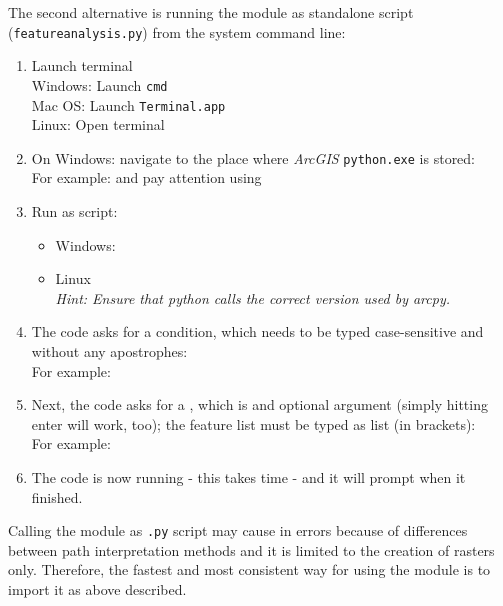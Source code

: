 The second alternative is running the module as standalone script (\texttt{feature{\myUnderscore}analysis.py}) from the system command line:
\begin{enumerate}
\item Launch terminal\\
	Windows: Launch \texttt{cmd}\\
	Mac OS: Launch \texttt{Terminal.app}\\
	Linux: Open terminal 
	\item On Windows: navigate to the place where \textit{ArcGIS} \texttt{python.exe} is stored:\\
	For example:  and pay attention using \\
	\item Run  as script:
	\begin{itemize}
		\item Windows: \pythoninline{python.exe DriveLetter:\\...\\LifespanDesign\\feature_analysis "condition" ["Feature"}\\\pythoninline{"name"]}
		\item Linux \\
		\textit{Hint: Ensure that python calls the correct version used by arcpy.}
	\end{itemize}
	\item The code asks for a condition, which needs to be typed case-sensitive and without any apostrophes:\\
	For example: 
\item Next, the code asks for a , which is and optional argument (simply hitting enter will work, too); the feature list must be typed as list (in brackets):\\
	For example: \\
	\item The code is now running - this takes time - and it will prompt when it finished.
\end{enumerate}
Calling the module as \texttt{.py} script may cause in errors because of differences between path interpretation methods and it is limited to the creation of rasters only. Therefore, the fastest and most consistent way for using the  module is to import it as above described.





